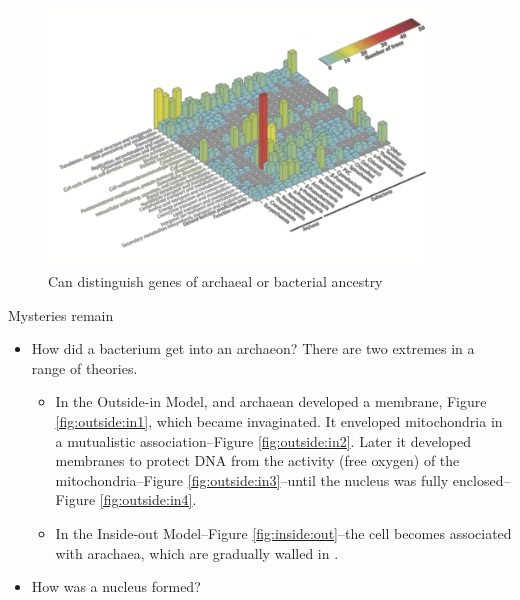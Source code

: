 \documentclass[]{article}
\begin{document}
\begin{figure}
	\caption{Can distinguish genes of archaeal or bacterial ancestry}
	\label{fig:distinguish:genes:archaeal:bacterial}
	\includegraphics[width=0.9\textwidth]{thiergart2012}
\end{figure}

Mysteries remain
\begin{itemize}
	\item How did a bacterium get into an archaeon? There are two extremes in a range of theories.
	\begin{itemize}
		\item In the Outside-in Model, and archaean developed a membrane, Figure \ref{fig:outside:in1}, which became invaginated. It enveloped mitochondria in a mutualistic association--Figure \ref{fig:outside:in2}. Later it developed membranes to protect DNA from the activity (free oxygen) of the mitochondria--Figure \ref{fig:outside:in3}--until the nucleus was fully enclosed--Figure \ref{fig:outside:in4}.
		\item In the Inside-out Model--Figure \ref{fig:inside:out}--the cell becomes associated with arachaea, which are gradually walled in \cite{baum2014inside}.
	\end{itemize}
	\item How was a nucleus formed?
\end{itemize}
\end{document}
